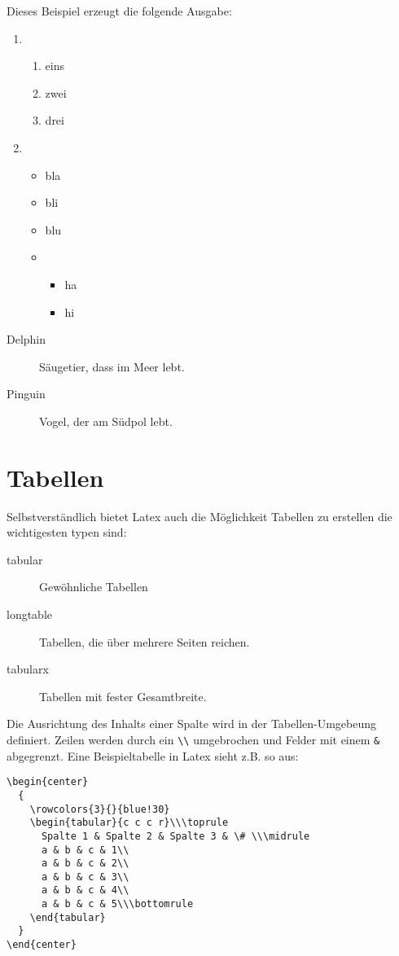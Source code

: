 Dieses Beispiel erzeugt die folgende Ausgabe:
\begin{enumerate}
\item
  \begin{enumerate}
  \item eins
  \item zwei
  \item drei
  \end{enumerate}
\item
  \begin{itemize}
  \item bla
  \item bli
  \item blu
  \item
    \begin{itemize}
    \item ha
    \item hi
    \end{itemize}
  \end{itemize}
\end{enumerate}
\begin{description}
\item[Delphin] Säugetier, dass im Meer lebt.
\item[Pinguin] Vogel, der am Südpol lebt. 
\end{description}

\section{Tabellen}
Selbstverständlich bietet Latex auch die Möglichkeit Tabellen zu erstellen die wichtigesten typen sind:
\begin{description}
\item[tabular] Gewöhnliche Tabellen
\item[longtable] Tabellen, die über mehrere Seiten reichen.
\item[tabularx] Tabellen mit fester Gesamtbreite.
\end{description}
Die Ausrichtung des Inhalts einer Spalte wird in der Tabellen-Umgebeung definiert. Zeilen werden durch ein
\verb+\\+ umgebrochen und Felder mit einem \verb+&+ abgegrenzt. Eine Beispieltabelle in Latex sieht z.B. so aus:
\begin{verbatim}
\begin{center}
  {
    \rowcolors{3}{}{blue!30}
    \begin{tabular}{c c c r}\\\toprule
      Spalte 1 & Spalte 2 & Spalte 3 & \# \\\midrule
      a & b & c & 1\\
      a & b & c & 2\\
      a & b & c & 3\\
      a & b & c & 4\\
      a & b & c & 5\\\bottomrule
    \end{tabular}
  }
\end{center}
\end{verbatim}

